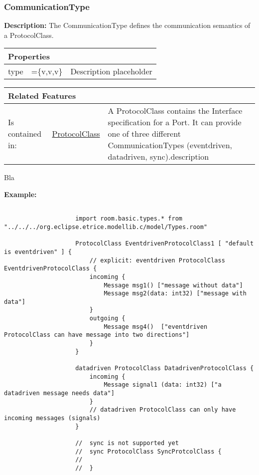 			
			
		\vspace{\baselineskip}
		\vspace{\baselineskip}
		\vspace{\baselineskip}
		
		\subsubsection{\huge CommunicationType}
			\hypertarget{ref:CommunicationType}{}
			
			\textbf{Description:} The CommunicationType defines the communication semantics of a ProtocolClass.
			
			\begingroup
			\renewcommand{\arraystretch}{1.8} %
			\begin{longtable}{p{2.5cm}p{4cm} p{}}
				\multicolumn{2}{l}{\textbf{\large Properties}} \\
				\hline
			\tabitem type & =\{v,v,v\} & Description placeholder\\
			\end{longtable}
			\endgroup
			
			
			\begingroup
			\renewcommand{\arraystretch}{1.8} %
			\begin{longtable}{p{2.5cm}|p{4cm} p{}}
				\multicolumn{2}{l}{\textbf{\large Related Features}} & \\
				\hline
			Is contained in: & \tabitem \hyperlink{ref:ProtocolClass}{ProtocolClass}  & A ProtocolClass contains the Interface specification for a Port. It can provide one of three different CommunicationTypes (eventdriven, datadriven, sync).description \\
			\hline
			\end{longtable}
			\endgroup
			
			Bla
			
			\textbf{Example:} 
					\begin{lstlisting}[language=ROOM]
				
					import room.basic.types.* from "../../../org.eclipse.etrice.modellib.c/model/Types.room"
				
					ProtocolClass EventdrivenProtocolClass1 [ "default is eventdriven" ] {
						// explicit: eventdriven ProtocolClass EventdrivenProtocolClass {
						incoming {
							Message msg1() ["message without data"]
							Message msg2(data: int32) ["message with data"]
						}
						outgoing {
							Message msg4()  ["eventdriven ProtocolClass can have message into two directions"]
						}
					}
				
					datadriven ProtocolClass DatadrivenProtocolClass {
						incoming {
							Message signal1 (data: int32) ["a datadriven message needs data"]
						}
						// datadriven ProtocolClass can only have incoming messages (signals)
					}
					
					//  sync is not supported yet
					//	sync ProtocolClass SyncProtcolClass { 
					//		
					//	}
					\end{lstlisting}
		

